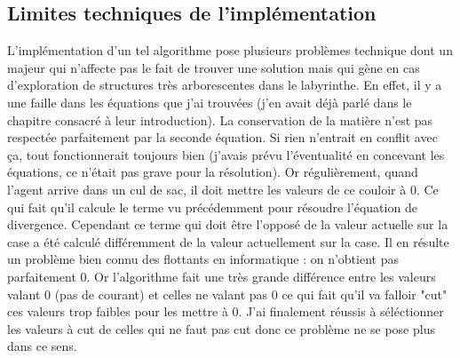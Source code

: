 \documentclass[10pt]{article}
\begin{document}
\subsection{Limites techniques de l'implémentation}
L'implémentation d'un tel algorithme pose plusieurs problèmes technique dont un majeur qui n'affecte pas le fait de trouver une solution mais qui gène en cas d'exploration de structures très arborescentes dans le labyrinthe. En effet, il y a une faille dans les équations que j'ai trouvées (j'en avait déjà parlé dans le chapitre consacré à leur introduction). La conservation de la matière n'est pas respectée parfaitement par la seconde équation. Si rien n'entrait en conflit avec ça, tout fonctionnerait toujours bien (j'avais prévu l'éventualité en concevant les équations, ce n'était pas grave pour la résolution). Or régulièrement, quand l'agent arrive dans un cul de sac, il doit mettre les valeurs de ce couloir à 0. Ce qui fait qu'il calcule le terme vu précédemment pour résoudre l'équation de divergence. Cependant ce terme qui doit être l'opposé de la valeur actuelle sur la case a été calculé différemment de la valeur actuellement sur la case. Il en résulte un problème bien connu des flottants en informatique : on n'obtient pas parfaitement 0. Or l'algorithme fait une très grande différence entre les valeurs valant 0 (pas de courant) et celles ne valant pas 0 ce qui fait qu'il va falloir "cut" ces valeurs trop faibles pour les mettre à 0. J'ai finalement réussis à séléctionner les valeurs à cut de celles qui ne faut pas cut donc ce problème ne se pose plus dans ce sens.
\end{document}
